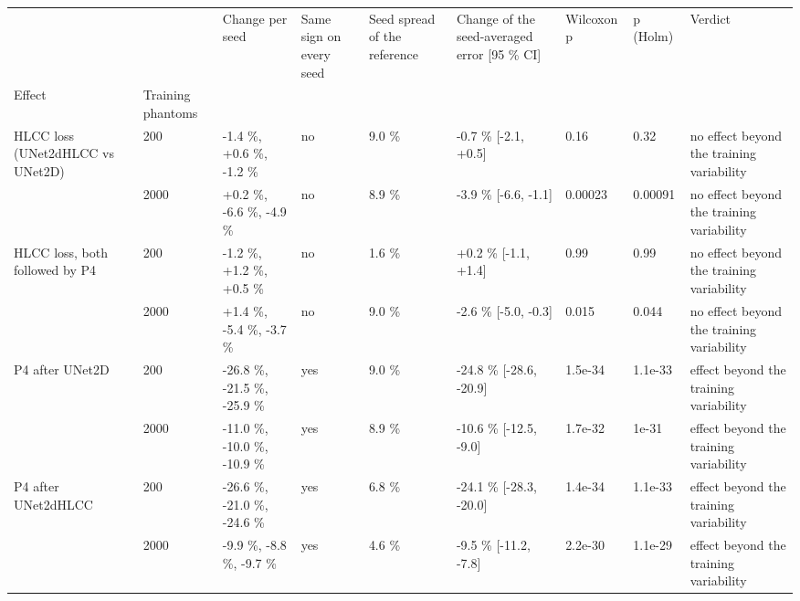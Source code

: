 \begin{tabular}{lllllllll}
\toprule
 &  & Change per seed & Same sign on every seed & Seed spread of the reference & Change of the seed-averaged error [95 \% CI] & Wilcoxon p & p (Holm) & Verdict \\
Effect & Training phantoms &  &  &  &  &  &  &  \\
\midrule
\multirow[t]{2}{*}{HLCC loss (UNet2dHLCC vs UNet2D)} & 200 & -1.4 \%, +0.6 \%, -1.2 \% & no & 9.0 \% & -0.7 \% [-2.1, +0.5] & 0.16 & 0.32 & no effect beyond the training variability \\
 & 2000 & +0.2 \%, -6.6 \%, -4.9 \% & no & 8.9 \% & -3.9 \% [-6.6, -1.1] & 0.00023 & 0.00091 & no effect beyond the training variability \\
\cline{1-9}
\multirow[t]{2}{*}{HLCC loss, both followed by P4} & 200 & -1.2 \%, +1.2 \%, +0.5 \% & no & 1.6 \% & +0.2 \% [-1.1, +1.4] & 0.99 & 0.99 & no effect beyond the training variability \\
 & 2000 & +1.4 \%, -5.4 \%, -3.7 \% & no & 9.0 \% & -2.6 \% [-5.0, -0.3] & 0.015 & 0.044 & no effect beyond the training variability \\
\cline{1-9}
\multirow[t]{2}{*}{P4 after UNet2D} & 200 & -26.8 \%, -21.5 \%, -25.9 \% & yes & 9.0 \% & -24.8 \% [-28.6, -20.9] & 1.5e-34 & 1.1e-33 & effect beyond the training variability \\
 & 2000 & -11.0 \%, -10.0 \%, -10.9 \% & yes & 8.9 \% & -10.6 \% [-12.5, -9.0] & 1.7e-32 & 1e-31 & effect beyond the training variability \\
\cline{1-9}
\multirow[t]{2}{*}{P4 after UNet2dHLCC} & 200 & -26.6 \%, -21.0 \%, -24.6 \% & yes & 6.8 \% & -24.1 \% [-28.3, -20.0] & 1.4e-34 & 1.1e-33 & effect beyond the training variability \\
 & 2000 & -9.9 \%, -8.8 \%, -9.7 \% & yes & 4.6 \% & -9.5 \% [-11.2, -7.8] & 2.2e-30 & 1.1e-29 & effect beyond the training variability \\
\cline{1-9}
\bottomrule
\end{tabular}
